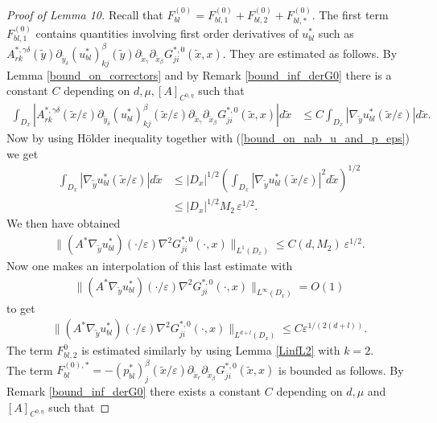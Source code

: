 \documentclass[11pt, reqno]{amsart}
\theoremstyle{definition}
\theoremstyle{remark}
\numberwithin{equation}{section}
\begin{document}
	\begin{proof}[Proof of \textup{Lemma 10}]
		\noindent Recall that  $	F^{(0)}_{bl}= F^{(0)}_{bl,1}+ F^{(0)}_{bl,2}+F^{(0)}_{bl,*}	$. The first term $ F^{(0)}_{bl,1}$ contains quantities involving first order derivatives of  $u_{bl}^*$ such as  $A^{*,\gamma\delta}_{rk}(\tilde{y})\partial_{\tilde{y}_\delta}(u^*_{bl})^{\beta}_{kj} (\tilde{y})\partial_{\tilde{x}_\gamma}\partial_{\tilde{x}_{\beta}} G_{ji}^{*,0} (\tilde{x},x)$. They    are estimated as follows. By Lemma \ref{bound_on_correctors} and by Remark \ref{bound_inf_derG0} there is a constant $C$ depending on $d,\mu, [A]_{C^{0,\eta}}$ such that
		\begin{align*}
			\int_{D_x} |A^{*,\gamma\delta}_{rk}(\tilde{x}/\varepsilon)\partial_{\tilde{y}_\delta} (u^*_{bl})^{\beta}_{kj}(\tilde{x}/\varepsilon)\partial_{\tilde{x}_\gamma}\partial_{\tilde{x}_{\beta}} G_{ji}^{*,0} (\tilde{x},x)|d\tilde{x} 
			&\leq C \int_{D_x} |\nabla_{\tilde{y}} u_{bl}^*(\tilde{x}/\varepsilon) | d\tilde{x}.
		\end{align*}
		Now by using Hölder inequality together with (\ref{bound_on_nab_u_and_p_eps}) we get
		\begin{align*}
			\int_{D_x} |\nabla_{\tilde{y}} u_{bl}^*(\tilde{x}/\varepsilon) | d\tilde{x} &\leq  |D_x|^{1/2} \left(	\int_{D_x} |\nabla_{\tilde{y}} u_{bl}^*(\tilde{x}/\varepsilon) |^2 d\tilde{x} \right)^{1/2}\\
			&\leq  |D_x|^{1/2} M_2\, \varepsilon^{1/2}.
		\end{align*}
		We then  have obtained
		\begin{align*}
			\|(A^* \nabla_{\tilde{y}} u_{bl}^*)(\cdot/\varepsilon) \nabla^2 G_{ji}^{*,0}(\cdot,x)\|_{L^1(D_x)} \leq C(d, M_2) \ \varepsilon ^{1/2} .
		\end{align*}
		Now one makes an interpolation of this last estimate with 
		\begin{align*}
			\|(A^* \nabla_{\tilde{y}} u_{bl}^*)(\cdot/\varepsilon) \nabla^2 G_{ji}^{*,0}(\cdot,x)\|_{L^\infty(D_x)} =O(1)
		\end{align*}
		to get
		\begin{align*}
			\|(A^* \nabla_{\tilde{y}} u_{bl}^*)(\cdot/\varepsilon) \nabla^2 G_{ji}^{*,0}(\cdot,x)\|_{L^{d+l}(D_x)} \leq C \varepsilon^{1/(2(d+l))} .
		\end{align*}
		\noindent The term  $F^0_{bl,2}$ is estimated similarly by using Lemma \ref{LinfL2} with $k=2$.\\
		\noindent The term  $F^{(0),*}_{bl}   =     - (p^*_{bl})^{\beta}_{j}(\tilde{x}/\varepsilon) \partial_{\tilde{x}_r}\partial_{\tilde{x}_{\beta}}G_{ji}^{*,0}  (\tilde{x},x)$  is bounded as follows. By Remark \ref{bound_inf_derG0} there exists a constant   $C$  depending on $d,\mu$ and $[A]_{C^{0,\eta}}$ such that 

\end{proof}
\end{document}

